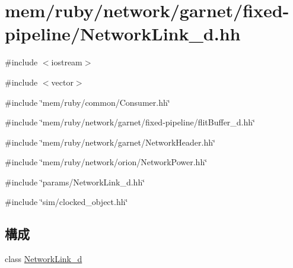 \hypertarget{NetworkLink__d_8hh}{
\section{mem/ruby/network/garnet/fixed-\/pipeline/NetworkLink\_\-d.hh}
\label{NetworkLink__d_8hh}
}
{\ttfamily \#include $<$iostream$>$}\par
{\ttfamily \#include $<$vector$>$}\par
{\ttfamily \#include \char`\"{}mem/ruby/common/Consumer.hh\char`\"{}}\par
{\ttfamily \#include \char`\"{}mem/ruby/network/garnet/fixed-\/pipeline/flitBuffer\_\-d.hh\char`\"{}}\par
{\ttfamily \#include \char`\"{}mem/ruby/network/garnet/NetworkHeader.hh\char`\"{}}\par
{\ttfamily \#include \char`\"{}mem/ruby/network/orion/NetworkPower.hh\char`\"{}}\par
{\ttfamily \#include \char`\"{}params/NetworkLink\_\-d.hh\char`\"{}}\par
{\ttfamily \#include \char`\"{}sim/clocked\_\-object.hh\char`\"{}}\par
\subsection*{構成}
\begin{DoxyCompactItemize}
\item 
class \hyperlink{classNetworkLink__d}{NetworkLink\_\-d}
\end{DoxyCompactItemize}

